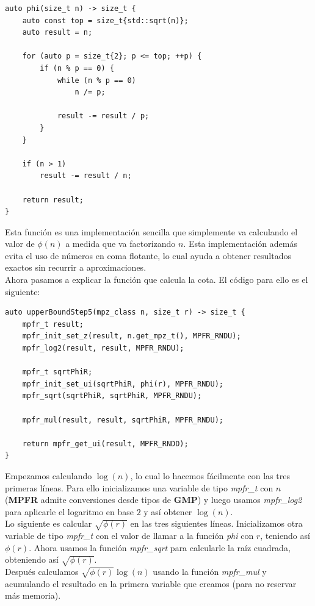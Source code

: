 \begin{lstlisting}
auto phi(size_t n) -> size_t {
	auto const top = size_t{std::sqrt(n)};
	auto result = n;

	for (auto p = size_t{2}; p <= top; ++p) {
		if (n % p == 0) {
			while (n % p == 0)
				n /= p;
	
			result -= result / p;
		}
	}
	
	if (n > 1)
		result -= result / n;
	
	return result;
}
\end{lstlisting}

Esta función es una implementación sencilla que simplemente va calculando el valor de $\phi(n)$ a medida que va factorizando $n$. Esta implementación además evita el uso de números en coma flotante, lo cual ayuda a obtener resultados exactos sin recurrir a aproximaciones.\\

Ahora pasamos a explicar la función que calcula la cota. El código para ello es el siguiente:\\

\begin{lstlisting}
auto upperBoundStep5(mpz_class n, size_t r) -> size_t {
	mpfr_t result;
	mpfr_init_set_z(result, n.get_mpz_t(), MPFR_RNDU);
	mpfr_log2(result, result, MPFR_RNDU);
	
	mpfr_t sqrtPhiR;
	mpfr_init_set_ui(sqrtPhiR, phi(r), MPFR_RNDU);
	mpfr_sqrt(sqrtPhiR, sqrtPhiR, MPFR_RNDU);
	
	mpfr_mul(result, result, sqrtPhiR, MPFR_RNDU);
	
	return mpfr_get_ui(result, MPFR_RNDD);
}
\end{lstlisting}

Empezamos calculando $\log(n)$, lo cual lo hacemos fácilmente con las tres primeras líneas. Para ello inicializamos una variable de tipo \textit{mpfr\_t} con $n$ (\textbf{MPFR} admite conversiones desde tipos de \textbf{GMP}) y luego usamos \textit{mpfr\_log2} para aplicarle el logaritmo en base $2$ y así obtener $\log(n)$.\\

Lo siguiente es calcular $\sqrt{\phi(r)}$ en las tres siguientes líneas. Inicializamos otra variable de tipo \textit{mpfr\_t} con el valor de llamar a la función \textit{phi} con $r$, teniendo así $\phi(r)$. Ahora usamos la función \textit{mpfr\_sqrt} para calcularle la raíz cuadrada, obteniendo así $\sqrt{\phi(r)}$.\\

Después calculamos $\sqrt{\phi(r)}\log(n)$ usando la función \textit{mpfr\_mul} y acumulando el resultado en la primera variable que creamos (para no reservar más memoria).\\

